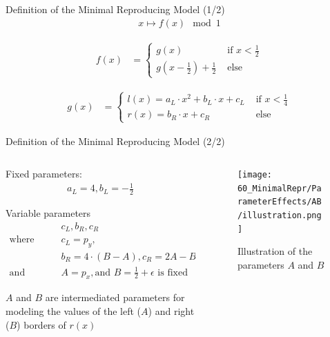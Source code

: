 \begin{frame}{Definition of the Minimal Reproducing Model (1/2)}
	\vspace{-3.0em}
	\begin{align}
		x \mapsto f(x) \mod 1
	\end{align}

	\begin{align}
		f(x) & = \begin{cases}
			         g(x)                                        & \text{ if } x < \frac{1}{2} \\
			         g\left(x - \frac{1}{2}\right) + \frac{1}{2} & \text{ else}
		         \end{cases}
	\end{align}

	\begin{align}
		g(x) & = \begin{cases}
			         l(x) = a_L \cdot x^2 + b_L \cdot x + c_L & \text{ if } x < \frac{1}{4} \\
			         r(x) = b_R \cdot x + c_R                 & \text{ else}
		         \end{cases}
	\end{align}
\end{frame}

\begin{frame}{Definition of the Minimal Reproducing Model (2/2)}
	\vspace{-1em}
	\begin{columns}
		\begin{column}{.7 \textwidth}
			Fixed parameters:
			\begin{align*}
				a_L = 4, b_L = -\frac{1}{2}
			\end{align*}

			Variable parameters
			\begin{align*}
				 & c_L, b_R, c_R                                                    \\
				\text{where} \qquad
				 & c_L = p_y,                                                       \\
				 & b_R = 4 \cdot (B - A), c_R = 2A - B                              \\
				\text {and} \qquad
				 & A = p_x, \text{and } B = \frac{1}{2} + \epsilon \text{ is fixed}
			\end{align*}

			$A$ and $B$ are intermediated parameters for modeling the values of the left ($A$) and right ($B$) borders of $r(x)$
		\end{column}
		\begin{column}{.3 \textwidth}
			\begin{figure}
				\centering
				\texttt{[image: 60\_MinimalRepr/ParameterEffects/AB/illustration.png]}
				\caption*{Illustration of the parameters $A$ and $B$}
			\end{figure}
		\end{column}
	\end{columns}
\end{frame}

